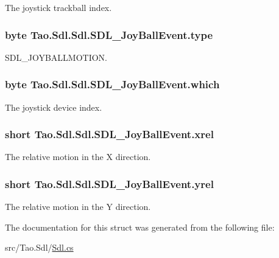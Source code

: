 The joystick trackball index. 

\hypertarget{struct_tao_1_1_sdl_1_1_sdl_1_1_s_d_l___joy_ball_event_a6a038a07869c454162161bb1705fc5d8}{
\subsubsection[{type}]{\setlength{\rightskip}{0pt plus 5cm}byte {\bf Tao.Sdl.Sdl.SDL\_\-JoyBallEvent.type}}}
\label{struct_tao_1_1_sdl_1_1_sdl_1_1_s_d_l___joy_ball_event_a6a038a07869c454162161bb1705fc5d8}


SDL\_\-JOYBALLMOTION. 

\hypertarget{struct_tao_1_1_sdl_1_1_sdl_1_1_s_d_l___joy_ball_event_ae830b51d29124cac5cd566050bdb89c9}{
\subsubsection[{which}]{\setlength{\rightskip}{0pt plus 5cm}byte {\bf Tao.Sdl.Sdl.SDL\_\-JoyBallEvent.which}}}
\label{struct_tao_1_1_sdl_1_1_sdl_1_1_s_d_l___joy_ball_event_ae830b51d29124cac5cd566050bdb89c9}


The joystick device index. 

\hypertarget{struct_tao_1_1_sdl_1_1_sdl_1_1_s_d_l___joy_ball_event_af581dbbfb3bd257fc84db29b95a7a17e}{
\subsubsection[{xrel}]{\setlength{\rightskip}{0pt plus 5cm}short {\bf Tao.Sdl.Sdl.SDL\_\-JoyBallEvent.xrel}}}
\label{struct_tao_1_1_sdl_1_1_sdl_1_1_s_d_l___joy_ball_event_af581dbbfb3bd257fc84db29b95a7a17e}


The relative motion in the X direction. 

\hypertarget{struct_tao_1_1_sdl_1_1_sdl_1_1_s_d_l___joy_ball_event_a6a627ec33bba38a21c2d0c6f2b09a41a}{
\subsubsection[{yrel}]{\setlength{\rightskip}{0pt plus 5cm}short {\bf Tao.Sdl.Sdl.SDL\_\-JoyBallEvent.yrel}}}
\label{struct_tao_1_1_sdl_1_1_sdl_1_1_s_d_l___joy_ball_event_a6a627ec33bba38a21c2d0c6f2b09a41a}


The relative motion in the Y direction. 



The documentation for this struct was generated from the following file:\begin{DoxyCompactItemize}
\item 
src/Tao.Sdl/\hyperlink{_sdl_8cs}{Sdl.cs}\end{DoxyCompactItemize}
